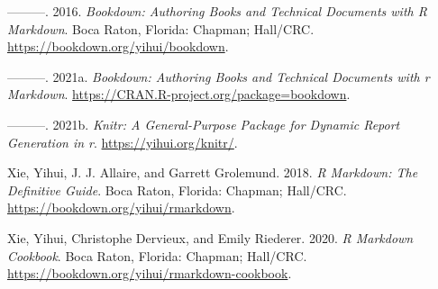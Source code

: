 \documentclass[
]{book}
\newlength{\cslhangindent}
\newlength{\cslentryspacingunit} %
\newenvironment{CSLReferences}[2] %
 {%
  \setlength{\parindent}{0pt}
  \ifodd #1
  \let\oldpar\par
  \def\par{\hangindent=\cslhangindent\oldpar}
  \fi
  \setlength{\parskip}{#2\cslentryspacingunit}
 }%
 {}
\begin{document}
\begin{CSLReferences}{1}{0}
\leavevmode{}%
---------. 2016. \emph{Bookdown: Authoring Books and Technical Documents with {R} Markdown}. Boca Raton, Florida: Chapman; Hall/CRC. \url{https://bookdown.org/yihui/bookdown}.

\leavevmode{}%
---------. 2021a. \emph{Bookdown: Authoring Books and Technical Documents with r Markdown}. \url{https://CRAN.R-project.org/package=bookdown}.

\leavevmode{}%
---------. 2021b. \emph{Knitr: A General-Purpose Package for Dynamic Report Generation in r}. \url{https://yihui.org/knitr/}.

\leavevmode{}%
Xie, Yihui, J. J. Allaire, and Garrett Grolemund. 2018. \emph{R Markdown: The Definitive Guide}. Boca Raton, Florida: Chapman; Hall/CRC. \url{https://bookdown.org/yihui/rmarkdown}.

\leavevmode{}%
Xie, Yihui, Christophe Dervieux, and Emily Riederer. 2020. \emph{R Markdown Cookbook}. Boca Raton, Florida: Chapman; Hall/CRC. \url{https://bookdown.org/yihui/rmarkdown-cookbook}.

\end{CSLReferences}
\end{document}
